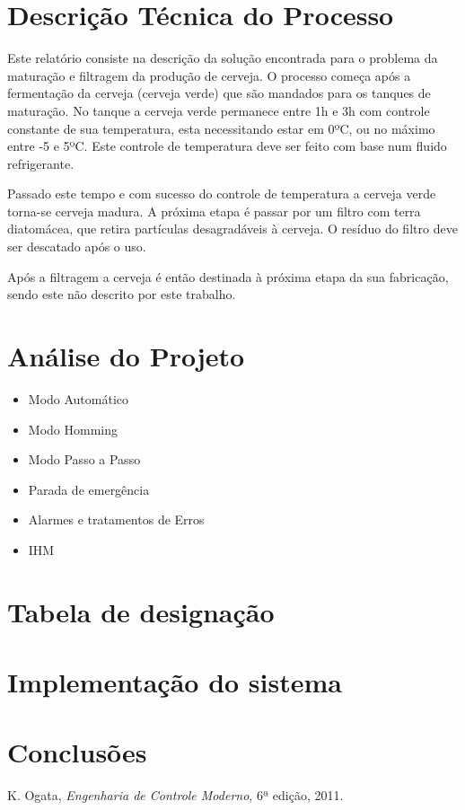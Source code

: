 \documentclass[12pt]{article}
\begin{document}


\tableofcontents
 
\clearpage

\onehalfspacing
\section{Descrição Técnica do Processo}

\begin{par}
Este relatório consiste na descrição da solução encontrada para o problema da maturação e filtragem da produção de cerveja. O processo começa após a fermentação da cerveja (cerveja verde) que são mandados para os tanques de maturação. No tanque a cerveja verde permanece entre 1h e 3h com controle constante de sua temperatura, esta necessitando estar em 0ºC, ou no máximo entre -5 e 5ºC. Este controle de temperatura deve ser feito com base num fluido refrigerante.

Passado este tempo e com sucesso do controle de temperatura a cerveja verde torna-se cerveja madura. A próxima etapa é passar por um filtro com terra diatomácea, que retira partículas desagradáveis à cerveja. O resíduo do filtro deve ser descatado após o uso.

Após a filtragem a cerveja é então destinada à próxima etapa da sua fabricação, sendo este não descrito por este trabalho.
\end{par}

\section {Análise do Projeto}
\begin {itemize}
\item Modo Automático

\item Modo Homming

\item Modo Passo a Passo

\item Parada de emergência

\item Alarmes e tratamentos de Erros

\item IHM
\end{itemize}

\section {Tabela de designação}

\section {Implementação do sistema}

\section {Conclusões}

\begin{thebibliography}{5}

 K. Ogata, \emph{Engenharia de Controle Moderno}, 6ª edição, 2011.

\end{thebibliography}
\end{document}
